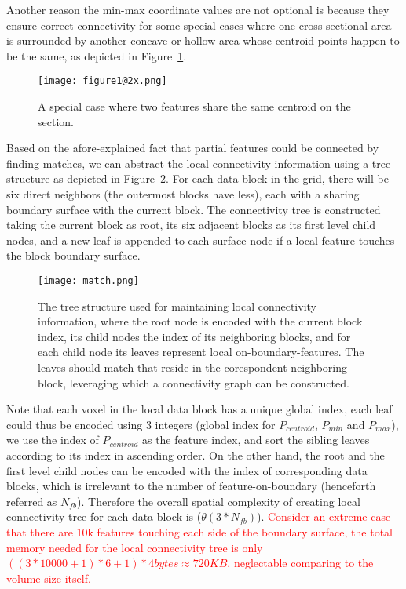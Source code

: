 Another reason the min-max coordinate values are not optional is because they ensure correct connectivity for some special cases where one cross-sectional area is surrounded by another concave or hollow area whose centroid points happen to be the same, as depicted in Figure~\ref{fig:special}.

\begin{figure}[ht]
	\centering
	\texttt{[image: figure1@2x.png]}
	\caption{A special case where two features share the same centroid on the section.}
	\label{fig:special}
\end{figure}

Based on the afore-explained fact that partial features could be connected by finding matches, we can abstract the local connectivity information using a tree structure as depicted in Figure~\ref{fig:match}. For each data block in the grid, there will be six direct neighbors (the outermost blocks have less), each with a sharing boundary surface with the current block. The connectivity tree is constructed taking the current block as root, its six adjacent blocks as its first level child nodes, and a new leaf is appended to each surface node if a local feature touches the block boundary surface.

\begin{figure}[ht]
	\centering
	\texttt{[image: match.png]}
	\caption{The tree structure used for maintaining local connectivity information, where the root node is encoded with the current block index, its child nodes the index of its neighboring blocks, and for each child node its leaves represent local on-boundary-features. The leaves should match that reside in the corespondent neighboring block, leveraging which a connectivity graph can be constructed.}
	\label{fig:match}
\end{figure}

Note that each voxel in the local data block has a unique global index, each leaf could thus be encoded using 3 integers (global index for $P_{centroid}$, $P_{min}$ and $P_{max}$), we use the index of $P_{centroid}$ as the feature index, and sort the sibling leaves according to its index in ascending order. On the other hand, the root and the first level child nodes can be encoded with the index of corresponding data blocks, which is irrelevant to the number of feature-on-boundary (henceforth referred as $N_{fb}$). Therefore the overall spatial complexity of creating local connectivity tree for each data block is ($\theta(3*N_{fb})$). \textcolor{red}{Consider an extreme case that there are 10k features touching each side of the boundary surface, the total memory needed for the local connectivity tree is only $((3*10000 + 1)*6 + 1) * 4 bytes \approx 720KB$, neglectable comparing to the volume size itself.}

